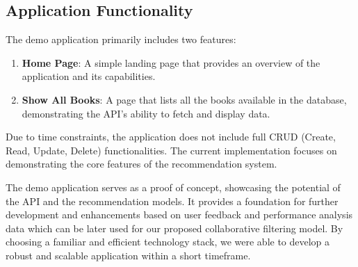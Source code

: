 \documentclass{article}
\begin{document}
\subsection{Application Functionality}

The demo application primarily includes two features:
\begin{enumerate}
    \item \textbf{Home Page}: A simple landing page that provides an overview of the application and its capabilities.
    \item \textbf{Show All Books}: A page that lists all the books available in the database, demonstrating the API's ability to fetch and display data.
\end{enumerate}

Due to time constraints, the application does not include full CRUD (Create, Read, Update, Delete) functionalities. The current implementation focuses on demonstrating the core features of the recommendation system.


The demo application serves as a proof of concept, showcasing the potential of the API and the recommendation models. It provides a foundation for further development and enhancements based on user feedback and performance analysis data which can be later used for our proposed collaborative filtering model. By choosing a familiar and efficient technology stack, we were able to develop a robust and scalable application within a short timeframe.
\end{document}
